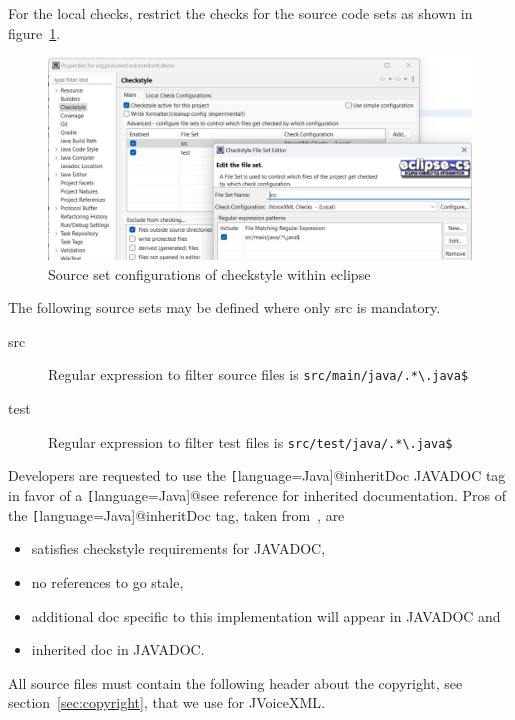 \documentclass[11pt,a4paper]{article}
\begin{document}
For the local checks, restrict the checks for the source code sets as shown in
figure~\ref{fig:eclipse-project-checkstyle-source-sets}. 
\begin{figure}
\includegraphics[width=\linewidth]{eclipse-project-checkstyle-source-sets.png}
\caption{Source set configurations of checkstyle within eclipse}
\label{fig:eclipse-project-checkstyle-source-sets}
\end{figure}
The following source sets may be defined where only src is mandatory.
\begin{description}
\item[src] Regular expression to filter source files is \verb!src/main/java/.*\.java$!
\item[test] Regular expression to filter test files is \verb!src/test/java/.*\.java$!
\end{description}

Developers are requested to use the \texttt[language=Java]{@inheritDoc}
JAVADOC tag in favor of a \texttt[language=Java]{@see} reference for inherited documentation.
Pros of the \texttt[language=Java]{@inheritDoc} tag, taken 
from~\cite{tauber:inheritdoc}, are
\begin{itemize}
\item satisfies checkstyle requirements for JAVADOC,
\item no references to go stale,
\item additional doc specific to this implementation will appear in JAVADOC and
\item inherited doc in JAVADOC.
\end{itemize}

All source files must contain the following header about the 
copyright, see section~\ref{sec:copyright}, that we use for JVoiceXML.
\end{document}
